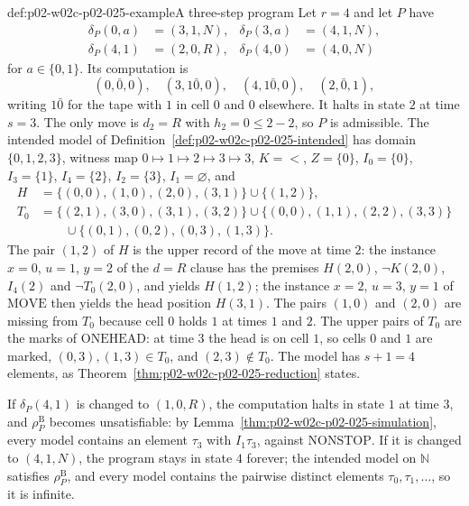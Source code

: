 \begin{hbexample}{def:p02-w02c-p02-025-example}{A three-step program}
Let \(r=4\) and let \(P\) have
\[
\begin{aligned}
 \delta_P(0,a)&=(3,1,N), & \delta_P(3,a)&=(4,1,N),\\
 \delta_P(4,1)&=(2,0,R), & \delta_P(4,0)&=(4,0,N)
\end{aligned}
\]
for \(a\in\{0,1\}\).  Its computation is
\[
 (0,\bar0,0),\quad(3,1\bar0,0),\quad(4,1\bar0,0),\quad(2,\bar0,1),
\]
writing \(1\bar0\) for the tape with \(1\) in cell \(0\) and \(0\) elsewhere.
It halts in state \(2\) at time \(s=3\).  The only move is \(d_2=R\) with
\(h_2=0\leq 2-2\), so \(P\) is admissible.  The intended model of
Definition~\ref{def:p02-w02c-p02-025-intended} has domain \(\{0,1,2,3\}\),
witness map \(0\mapsto1\mapsto2\mapsto3\mapsto3\), \(K={<}\), \(Z=\{0\}\),
\(I_0=\{0\}\), \(I_3=\{1\}\), \(I_4=\{2\}\), \(I_2=\{3\}\), \(I_1=\varnothing\), and
\[
\begin{aligned}
 H&=\{(0,0),(1,0),(2,0),(3,1)\}\cup\{(1,2)\},\\
 T_0&=\{(2,1),(3,0),(3,1),(3,2)\}\cup\{(0,0),(1,1),(2,2),(3,3)\}\\
   &\qquad\cup\{(0,1),(0,2),(0,3),(1,3)\}.
\end{aligned}
\]
The pair \((1,2)\) of \(H\) is the upper record of the move at time \(2\): the
instance \(x=0\), \(u=1\), \(y=2\) of the \(d=R\) clause has the premises
\(H(2,0)\), \(\neg K(2,0)\), \(I_4(2)\) and \(\neg T_0(2,0)\), and yields
\(H(1,2)\); the instance \(x=2\), \(u=3\), \(y=1\) of \(\mathrm{MOVE}\) then
yields the head position \(H(3,1)\).  The pairs \((1,0)\) and \((2,0)\) are
missing from \(T_0\) because cell \(0\) holds \(1\) at times \(1\) and \(2\).
The upper pairs of \(T_0\) are the marks of \(\mathrm{ONEHEAD}\): at time \(3\)
the head is on cell \(1\), so cells \(0\) and \(1\) are marked,
\((0,3),(1,3)\in T_0\), and \((2,3)\notin T_0\).  The model has
\(s+1=4\) elements, as Theorem~\ref{thm:p02-w02c-p02-025-reduction} states.

If \(\delta_P(4,1)\) is changed to \((1,0,R)\), the computation halts in state
\(1\) at time \(3\), and \(\rho^{\mathrm B}_P\) becomes unsatisfiable: by
Lemma~\ref{thm:p02-w02c-p02-025-simulation}, every model contains an element
\(\tau_3\) with \(I_1\tau_3\), against \(\mathrm{NONSTOP}\).  If it is changed
to \((4,1,N)\), the program stays in state \(4\) forever; the intended model
on \(\mathbb N\) satisfies \(\rho^{\mathrm B}_P\), and every model contains
the pairwise distinct elements \(\tau_0,\tau_1,\ldots\), so it is infinite.
\end{hbexample}

